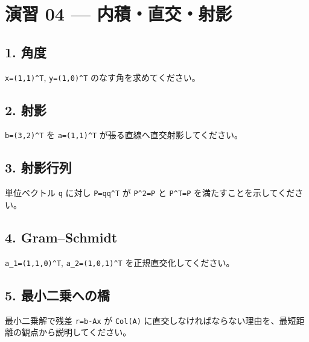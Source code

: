 \documentclass[
  11pt,
  a4paper,
]{ltjsarticle}
\author{}
\date{}
\begin{document}
\hypertarget{ux6f14ux7fd2-04-ux5185ux7a4dux76f4ux4ea4ux5c04ux5f71}{%
\section{演習 04 ---
内積・直交・射影}\label{ux6f14ux7fd2-04-ux5185ux7a4dux76f4ux4ea4ux5c04ux5f71}}

\hypertarget{ux89d2ux5ea6}{%
\subsection{1. 角度}\label{ux89d2ux5ea6}}

\texttt{x=(1,1)\^{}T}, \texttt{y=(1,0)\^{}T} のなす角を求めてください。

\hypertarget{ux5c04ux5f71}{%
\subsection{2. 射影}\label{ux5c04ux5f71}}

\texttt{b=(3,2)\^{}T} を \texttt{a=(1,1)\^{}T}
が張る直線へ直交射影してください。

\hypertarget{ux5c04ux5f71ux884cux5217}{%
\subsection{3. 射影行列}\label{ux5c04ux5f71ux884cux5217}}

単位ベクトル \texttt{q} に対し \texttt{P=qq\^{}T} が \texttt{P\^{}2=P}
と \texttt{P\^{}T=P} を満たすことを示してください。

\hypertarget{gramschmidt}{%
\subsection{4. Gram--Schmidt}\label{gramschmidt}}

\texttt{a\_1=(1,1,0)\^{}T}, \texttt{a\_2=(1,0,1)\^{}T}
を正規直交化してください。

\hypertarget{ux6700ux5c0fux4e8cux4e57ux3078ux306eux6a4b}{%
\subsection{5.
最小二乗への橋}\label{ux6700ux5c0fux4e8cux4e57ux3078ux306eux6a4b}}

最小二乗解で残差 \texttt{r=b-Ax} が \texttt{Col(A)}
に直交しなければならない理由を、最短距離の観点から説明してください。
\end{document}
